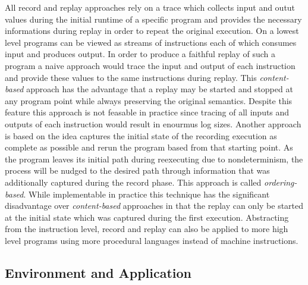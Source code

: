 \documentclass[11pt,a4paper]{book}
\begin{document}
All record and replay approaches rely on a trace which collects input and
outut values during the initial runtime of a specific program and provides
the necessary informations during replay in order to repeat the original
execution. On a lowest level programs can be viewed as streams of instructions
each of which consumes input and produces output. In order to produce a
faithful replay of such a program a naive approach would trace the input and
output of each instruction and provide these values to the same instructions
during replay. This \textit{content-based} approach has the advantage that a replay
may be started and stopped at any program point while always preserving the
original semantics. Despite this feature this approach is not feasable in
practice since tracing of all inputs and outputs of each instruction would
result in enourmus log sizes. Another approach is based on the idea captures
the initial state of the recording execution as complete as possible and rerun
the program based from that starting point. As the program leaves its initial
path during reexecuting due to nondeterminism, the process will be nudged to
the desired path through information that was additionally captured during
the record phase. This approach is called \textit{ordering-based}.
While implementable in practice this technique has the
significant disadvantage over \textit{content-based} approaches in that the replay
can only be started at the initial state which was captured during the first
execution. Abstracting from the instruction level, record and replay can also
be applied to more high level programs using more procedural languages instead
of machine instructions.

\subsection{Environment and Application}
\end{document}
